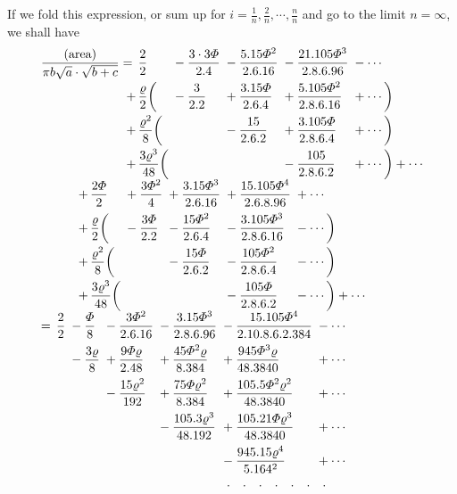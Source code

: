 \documentclass[11pt]{article}
\begin{document}
If we fold this expression, or sum up for $i=\frac{1}{n},\frac{2}{n},\cdots,\frac{n}{n}$ and go to the limit $n=\infty$, we shall have
\[
\begin{array}{@{}l@{}}
\begin{array}{@{}r@{\,}l@{\;}l@{\;}l@{\;}l@{\;}l@{}}
\dfrac{\text{(area)}}{\pi b\sqrt{a}\cdot\sqrt{b+c}}={}
  & \dfrac{2}{2}
  & {}-\dfrac{3\cdot3\varPhi}{2.4}
  & {}-\dfrac{5.15\varPhi^{2}}{2.6.16}
  & {}-\dfrac{21.105\varPhi^{3}}{2.8.6.96}
  & {}-\cdots\\[3mm]
+ & \dfrac{\varrho}{2}\biggl(
  & {}-\dfrac{3}{2.2}
  & {}+\dfrac{3.15\varPhi}{2.6.4}\text{}
  & {}+\dfrac{5.105\varPhi^{2}}{2.8.6.16}
  & {}+\cdots\biggr)\\[3mm]
+ & \dfrac{\varrho^{2}}{8}\biggl(
  &
  & {}-\dfrac{15}{2.6.2}
  & {}+\dfrac{3.105\varPhi}{2.8.6.4}
  & {}+\cdots\biggr)\\[3mm]
+ & \dfrac{3\varrho^{3}}{48}\biggl(
  &
  &
  & {}-\dfrac{105}{2.8.6.2}
  & {}+\cdots\biggr)+\cdots
\end{array}\\[3mm]
\qquad\quad
\begin{array}{@{}r@{\,}l@{\;}l@{\;}l@{\;}l@{\;}l@{}}
+ & \dfrac{2\varPhi}{2}
  & {}+\dfrac{3\varPhi^{2}}{4}
  & {}+\dfrac{3.15\varPhi^{3}}{2.6.16}
  & {}+\dfrac{15.105\varPhi^{4}}{2.6.8.96}
  & {}+\cdots\\[3mm]
+ & \dfrac{\varrho}{2}\biggl(
  & {}-\dfrac{3\varPhi}{2.2}
  & {}-\dfrac{15\varPhi^{2}}{2.6.4}
  & {}-\dfrac{3.105\varPhi^{3}}{2.8.6.16}
  & {}-\cdots\biggr)\\[3mm]
+ & \dfrac{\varrho^{2}}{8}\biggl(
  &
  & {}-\dfrac{15\varPhi}{2.6.2}
  & {}-\dfrac{105\varPhi^{2}}{2.8.6.4}
  & {}-\cdots\biggr)\\[3mm]
+ & \dfrac{3\varrho^{3}}{48}\biggl(
  &
  &
  & {}-\dfrac{105\varPhi}{2.8.6.2}
  & {}-\cdots\biggr)+\cdots
\end{array}\\[3mm]
\begin{array}{@{}r@{\,}l@{\;}l@{\;}l@{\;}l@{\;}l@{\;}l@{}}
={} & \dfrac{2}{2}
  & {}-\dfrac{\varPhi}{8}
  & {}-\dfrac{3\varPhi^{2}}{2.6.16}
  & {}-\dfrac{3.15\varPhi^{3}}{2.8.6.96}
  & {}-\dfrac{15.105\varPhi^{4}}{2.10.8.6.2.384}
  & {}-\cdots\\[3mm]
  &
  & {}-\dfrac{3\varrho}{8}
  & {}+\dfrac{9\varPhi\varrho}{2.48}
  & {}+\dfrac{45\varPhi^{2}\varrho}{8.384}
  & {}+\dfrac{945\varPhi^{3}\varrho}{48.3840}
  & {}+\cdots\\[3mm]
  &
  &
  & {}-\dfrac{15\varrho^{2}}{192}
  & {}+\dfrac{75\varPhi\varrho^{2}}{8.384}
  & {}+\dfrac{105.5\varPhi^{2}\varrho^{2}}{48.3840}
  & {}+\cdots\\[3mm]
  &
  &
  &
  & {}-\dfrac{105.3\varrho^{3}}{48.192}
  & {}+\dfrac{105.21\varPhi\varrho^{3}}{48.3840}
  & {}+\cdots\\[3mm]
  &
  &
  &
  &
  & {}-\dfrac{945.15\varrho^{4}}{5.164^{2}}\text{}
  & {}+\cdots\\[2mm]
  &
  &
  &
  &
  & \multicolumn{2}{l}{.\quad.\quad.\quad.\quad.\quad.\quad.}
\end{array}
\end{array}
\]
\end{document}
